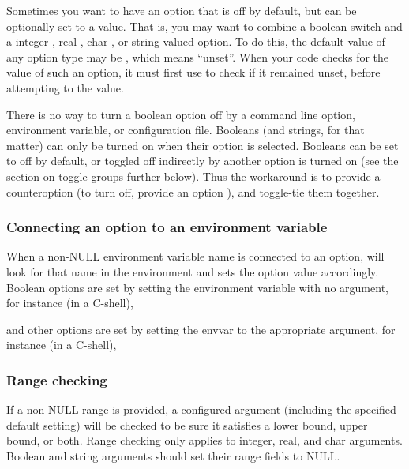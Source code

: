 Sometimes you want to have an option that is off by default, but can
be optionally set to a value. That is, you may want to combine a
boolean switch and a integer-, real-, char-, or string-valued
option. To do this, the default value of any option type may be
, which means ``unset''. When your code checks for the
value of such an option, it must first use
 to check if it remained unset, before
attempting to  the value.

There is no way to turn a boolean option off by a command line option,
environment variable, or configuration file. Booleans (and strings,
for that matter) can only be turned on when their option is
selected. Booleans can be set to off by default, or toggled off
indirectly by another option is turned on (see the section on toggle
groups further below). Thus the workaround is to provide a
counteroption (to turn  off, provide an option
), and toggle-tie them together.



   \subsubsection{Connecting an option to an environment variable}

When a non-NULL environment variable name is connected to an option,
 will look for that name in the
environment and sets the option value accordingly. Boolean options are
set by setting the environment variable with no argument, for instance
(in a C-shell),

\begin{cchunk}
\end{cchunk}

and other options are set by setting the envvar to the appropriate
argument, for instance (in a C-shell),

\begin{cchunk}
\end{cchunk}



   \subsubsection{Range checking}

If a non-NULL range is provided, a configured argument (including the
specified default setting) will be checked to be sure it satisfies a
lower bound, upper bound, or both. Range checking only applies to
integer, real, and char arguments. Boolean and string arguments should
set their range fields to NULL.

